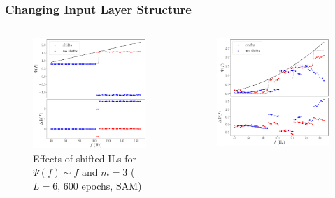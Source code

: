 \documentclass{beamer}
\begin{document}
\begin{frame}
\frametitle{Changing Input Layer Structure}
\begin{columns}
\begin{column}{0.5\textwidth}
\begin{figure}
\centering 
\includegraphics[width=\textwidth]{im/phase_shift_comp_linear_m3}
\caption{Effects of shifted ILs for $\Psi(f) \sim f$ and $m=3$ ($L=6$, 600 epochs, SAM)}
\end{figure}
\end{column}
\begin{column}{0.5\textwidth}
\begin{figure}
\centering 
\includegraphics[width=\textwidth]{im/phase_shift_comp_quadratic_m3}

\end{figure}
\end{column}
\end{columns}
\end{frame}
\end{document}
